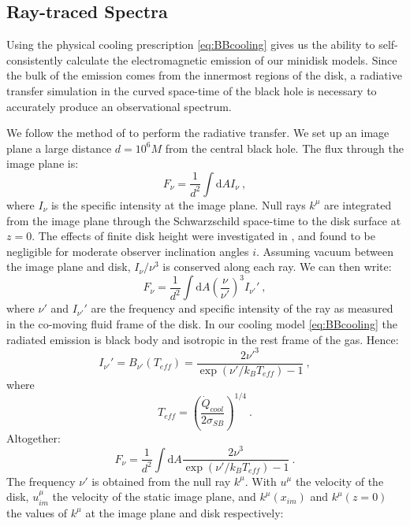 \documentclass{emulateapj}
\newcommand{\sig}{\sigma}
\newcommand{\dd}{\mbox{d}}
\begin{document}
\subsection{Ray-traced Spectra}
\label{subsec:raySpec}

Using the physical cooling prescription \eqref{eq:BBcooling} gives us the ability to self-consistently calculate the electromagnetic emission of our minidisk models.  Since the bulk of the emission comes from the innermost regions of the disk, a radiative transfer simulation in the curved space-time of the black hole is necessary to accurately produce an observational spectrum.

We follow the method of \cite{Kulkarni11, Zhu12} to perform the radiative transfer.  We set up an image plane a large distance $d = 10^6 M$ from the central black hole.  The flux through the image plane is:
\begin{equation}
	F_\nu = \frac{1}{d^2} \int \dd A I_\nu \ ,
\end{equation}
where $I_\nu$ is the specific intensity at the image plane.  Null rays $k^\mu$ are integrated from the image plane through the Schwarzschild space-time to the disk surface at $z=0$.  The effects of finite disk height were investigated in \cite{Kulkarni11}, and found to be negligible for moderate observer inclination angles $i$. Assuming vacuum between the image plane and disk, $I_\nu / \nu^3$ is conserved along each ray.  We can then write:
\begin{equation}
	F_\nu = \frac{1}{d^2} \int \dd A \left( \frac{\nu}{\nu'} \right)^3 I_{\nu'}' \ ,
\end{equation}
where $\nu'$ and $I_{\nu'}'$ are the frequency and specific intensity of the ray as measured in the co-moving fluid frame of the disk. In our cooling model \eqref{eq:BBcooling} the radiated emission is black body and isotropic in the rest frame of the gas.  Hence:
\begin{equation}
	I_{\nu'}' = B_{\nu '} (T_{eff}) = \frac{2 {\nu'}^3}{\exp\left(\nu' / k_B T_{eff}\right) - 1}\ ,
\end{equation}
where
\begin{equation}
	T_{eff} = \left(\frac{\dot{Q}_{cool}}{2 \sig_{SB}} \right)^{1/4} \ .
\end{equation}
Altogether:
\begin{equation}
	F_{\nu} = \frac{1}{d^2} \int \dd A \frac{2 \nu^3}{\exp\left(\nu' / k_B T_{eff}\right) - 1} \ .
\end{equation}
The frequency $\nu'$ is obtained from the null ray $k^\mu$.  With $u^\mu$ the velocity of the disk, $u_{im}^\mu$ the velocity of the static image plane, and $k^\mu(x_{im})$ and $k^\mu(z=0)$ the values of $k^\mu$ at the image plane and disk respectively:
\end{document}
